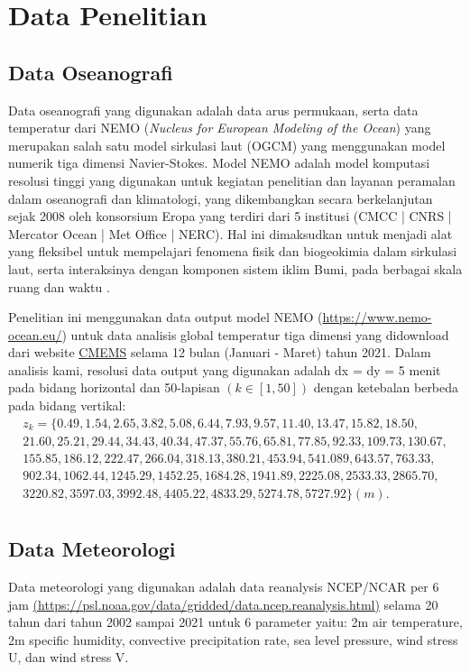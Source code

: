 \section[Data Penelitian]{Data Penelitian}
\begin{spacing}{1.5}
\vspace{-1pc}
\subsection[Data Oseanografi]{Data Oseanografi}
	Data oseanografi yang digunakan adalah data arus permukaan, serta data temperatur dari NEMO (\textit{Nucleus for European Modeling of the Ocean}) yang merupakan salah satu model sirkulasi laut (OGCM) yang menggunakan model numerik tiga dimensi Navier-Stokes. Model NEMO adalah model komputasi resolusi tinggi yang digunakan untuk kegiatan penelitian dan layanan peramalan dalam oseanografi dan klimatologi, yang dikembangkan secara berkelanjutan sejak 2008 oleh konsorsium Eropa yang terdiri dari 5 institusi (CMCC | CNRS | Mercator Ocean | Met Office | NERC). Hal ini dimaksudkan untuk menjadi alat yang fleksibel untuk mempelajari fenomena fisik dan biogeokimia dalam sirkulasi laut, serta interaksinya dengan komponen sistem iklim Bumi, pada berbagai skala ruang dan waktu . 
	
	Penelitian ini menggunakan data output model NEMO (\href{https://www.nemo-ocean.eu/}{https://www.nemo-ocean.eu/}) untuk data analisis global temperatur tiga dimensi yang didownload dari website \href{https://resources.marine.copernicus.eu/products}{CMEMS} selama 12 bulan (Januari - Maret) tahun 2021.  Dalam analisis kami, resolusi data output yang digunakan adalah dx = dy = 5 menit pada bidang horizontal dan 50-lapisan $(k \in [1,50])$ dengan ketebalan berbeda pada bidang vertikal:
	\begin{equation*}
		\begin{aligned}
			z_k = \{0.49, 1.54, 2.65, 3.82, 5.08, 6.44, 7.93, 9.57, 11.40, 13.47, 15.82, 18.50, \\
			21.60, 25.21, 29.44, 34.43, 40.34, 47.37, 55.76, 65.81, 77.85, 92.33, 109.73, 130.67, \\
			155.85, 186.12, 222.47, 266.04, 318.13, 380.21, 453.94, 541.089, 643.57, 763.33, \\
			902.34, 1062.44, 1245.29, 1452.25, 1684.28, 1941.89, 2225.08, 2533.33, 2865.70,  \\
			3220.82, 3597.03, 3992.48, 4405.22, 4833.29, 5274.78, 5727.92 \} (m). \\
		\end{aligned}
	\end{equation*}
\subsection[Data Meteorologi]{Data Meteorologi}
	Data meteorologi yang digunakan adalah data reanalysis NCEP/NCAR per 6 jam \href{https://psl.noaa.gov/data/gridded/data.ncep.reanalysis.html}{(https://psl.noaa.gov/data/gridded/data.ncep.reanalysis.html)} selama 20 tahun dari tahun 2002 sampai 2021 untuk 6 parameter yaitu: 2m air temperature, 2m specific humidity, convective precipitation rate, sea level pressure, wind stress U, dan wind stress V.
\end{spacing}
